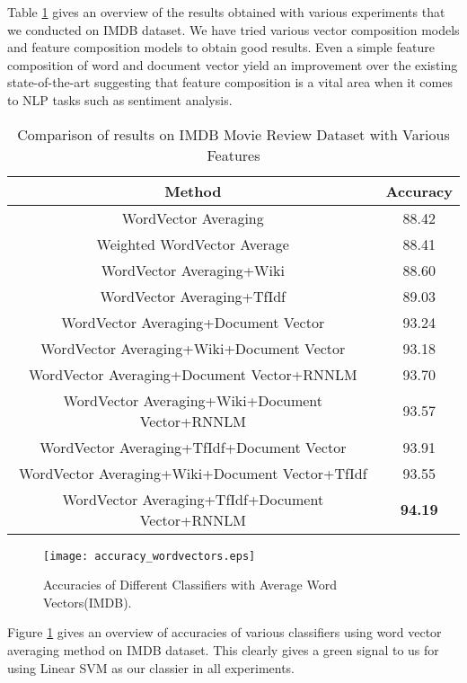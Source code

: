 Table \ref{table:IMDB_features} gives an overview of the results obtained with various experiments that we conducted on IMDB dataset. We have tried various vector composition models and feature composition models to obtain good results. Even a simple feature composition of word and document vector yield an improvement over the existing state-of-the-art suggesting that feature composition is a vital area when it comes to NLP tasks such as sentiment analysis.
\begin {table}[H]
\centering
\begin{tabular}{ | c | c | }
\hline
\textbf{Method} & \textbf{Accuracy} \\ \hline
WordVector Averaging & 88.42\\ \hline
Weighted WordVector Average & 88.41\\ \hline
WordVector Averaging+Wiki & 88.60\\ \hline
WordVector Averaging+TfIdf & 89.03\\ \hline
WordVector Averaging+Document Vector & 93.24\\ \hline
WordVector Averaging+Wiki+Document Vector & 93.18\\ \hline
WordVector Averaging+Document Vector+RNNLM & 93.70\\ \hline
WordVector Averaging+Wiki+Document Vector+RNNLM & 93.57\\ \hline
WordVector Averaging+TfIdf+Document Vector & 93.91\\ \hline
WordVector Averaging+Wiki+Document Vector+TfIdf & 93.55\\ \hline
WordVector Averaging+TfIdf+Document Vector+RNNLM & \textbf{94.19}\\ \hline
\end{tabular}
\caption {Comparison of results on IMDB Movie Review Dataset with Various Features}
\label{table:IMDB_features}
\end{table}

\begin{figure}[H]
\centering
\texttt{[image: accuracy\_wordvectors.eps]}
\caption{Accuracies of Different Classifiers with Average Word Vectors(IMDB). \label{fig:accuracy_wordvectors}}
\end{figure}
Figure \ref{fig:accuracy_wordvectors} gives an overview of accuracies of various classifiers using word vector averaging method on IMDB dataset. This clearly gives a green signal to us for using Linear SVM as our classier in all experiments.

